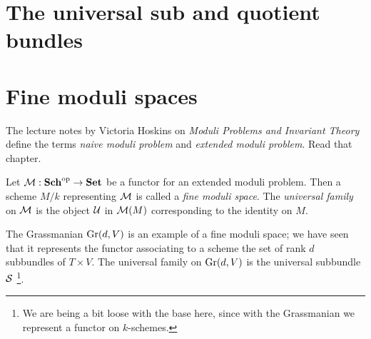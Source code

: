 \section{The universal sub and quotient bundles}

\section{Fine moduli spaces}

The lecture notes by Victoria Hoskins on \emph{Moduli Problems and Invariant Theory} \cite[Chapter~2]{m15} define the terms \emph{naive moduli problem} and \emph{extended moduli problem}. Read that chapter.
\begin{definition}
	Let $\mathcal{M}: \mathbf{Sch}^{\operatorname{op}} \to \mathbf{Set}$ be a functor for an extended moduli problem. Then a scheme $M/k$ representing $\mathcal{M}$ is called a \emph{fine moduli space}. The \emph{universal family} on $\mathcal{M}$ is the object $\mathcal{U}$ in $\mathcal{M}(M)$ corresponding to the identity on $M$.
\end{definition}

The Grassmanian $\operatorname{Gr}(d, V)$ is an example of a fine moduli space; we have seen that it represents the functor associating to a scheme the set of rank $d$ subbundles of $T \times V$. The universal family on $\operatorname{Gr}(d, V)$ is the universal subbundle $\mathcal{S}$ \footnote{We are being a bit loose with the base here, since with the Grassmanian we represent a functor on $k$-schemes.}.

